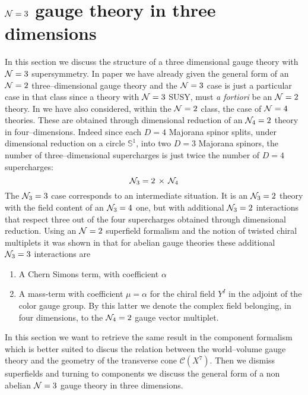 \documentclass[a4paper,12pt]{article}
\begin{document}
\section{${\cal N}=3$ gauge theory in three dimensions}\label{N=3gaugetheory}
In this section we discuss the structure of a three dimensional gauge
theory with ${\cal N}=3$ supersymmetry. In paper \cite{susp} we
have already given the general form of an ${\cal N}=2$
three--dimensional gauge theory and the ${\cal N}=3$ case is just
a particular case in that class since a theory with ${\cal N}=3$
SUSY, must {\it a fortiori} be an ${\cal N}=2$ theory.
In \cite{susp} we have also considered, within the ${\cal N}=2$
class, the case of ${\cal N}=4$ theories. These are obtained
through dimensional reduction of an ${\cal N}_4=2$ theory in
four--dimensions.
Indeed since each $D=4$ Majorana spinor splits, under dimensional
reduction on a circle $\mathbb{S}^1$, into two $D=3$ Majorana
spinors, the number of three--dimensional supercharges is just twice
the number of $D=4$ supercharges:
\begin{equation}
  {\cal N}_3 = 2 \, \times \, {\cal N}_4
\label{n34}
\end{equation}
The ${\cal N}_3=3$ case corresponds to an intermediate situation.
It is an ${\cal N}_3=2$ theory with the field content of an
${\cal N}_3=4$ one, but with additional ${\cal N}_3=2$ interactions
that respect  three out of the four supercharges obtained through
dimensional reduction.
Using an ${\cal N}=2$ superfield formalism and the notion of twisted
chiral multiplets it was shown in \cite{kapustin} that for abelian
gauge theories these additional ${\cal N}_3=3$ interactions are
\begin{enumerate}
  \item A Chern Simons term, with coefficient $\alpha$
  \item A mass-term  with coefficient $\mu=\alpha$ for the
  chiral field $Y^I$ in the adjoint of the color gauge group.
  By this latter we denote the complex field belonging,
  in four dimensions, to the ${\cal N}_4=2$ gauge
  vector multiplet.
\end{enumerate}
In this section we want to retrieve the same result in the
component formalism which is better suited to discus the relation
between the world--volume gauge theory and the geometry of the
transverse cone $\mathcal{C}(X^7)$.
Then we dismiss superfields and turning to components we discuss
the general form of a non abelian $ {\cal N}=3$ gauge theory in
three dimensions.
\end{document}
